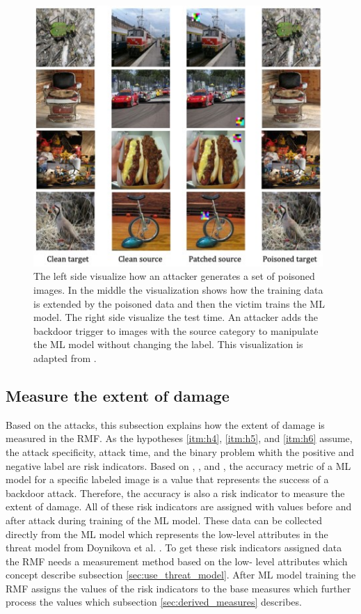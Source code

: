 \begin{figure}[ht!]
  \centering
  \includegraphics[width=11cm]{pictures/poisoned_hidden_trigger.jpg}
  \caption{The left side visualize how an attacker generates a set of poisoned images. In the middle the visualization shows how the training data is extended by the poisoned data and then the victim trains the ML model. The right side visualize the test time. An attacker adds the backdoor trigger to images with the source category to manipulate the ML model without changing the label. This visualization is adapted from \cite{DBLP:journals/corr/abs-1910-00033}.}
  \label{fig:poisoned_hidden_trigger}
\end{figure}

\subsection{Measure the extent of damage}
\label{sec:ext_dmg}

Based on the attacks, this subsection explains how the extent of damage is measured in the RMF. As the hypotheses \ref{itm:h4}, \ref{itm:h5}, and \ref{itm:h6} assume, the attack specificity, attack time, and the binary problem whith the positive and negative label are risk indicators. Based on \cite{DBLP:journals/corr/abs-1708-06733}, \cite{turner2018clean}, and \cite{DBLP:journals/corr/abs-1910-00033}, the accuracy metric of a ML model for a specific labeled image is a value that represents the success of a backdoor attack. Therefore, the accuracy is also a risk indicator to measure the extent of damage. All of these risk indicators are assigned with values before and after attack during training of the ML model. These data can be collected directly from the ML model which represents the low-level attributes in the threat model from Doynikova et al. \cite{DBLP:conf/crisis/DoynikovaNGK20}. To get these risk indicators assigned data the RMF needs a measurement method based on the low-
level attributes which concept describe subsection \ref{sec:use_threat_model}. After ML model training the RMF assigns the values of the risk indicators to the base measures which further process the values which subsection \ref{sec:derived_measures} describes.

